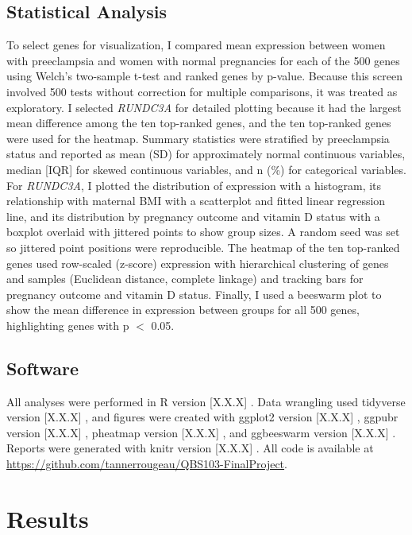 \documentclass[11pt]{article}
\begin{document}
\subsection{Statistical Analysis}
To select genes for visualization, I compared mean expression between women with preeclampsia and women with normal pregnancies for each of the 500 genes using Welch's two-sample t-test and ranked genes by p-value. Because this screen involved 500 tests without correction for multiple comparisons, it was treated as exploratory. I selected \textit{RUNDC3A} for detailed plotting because it had the largest mean difference among the ten top-ranked genes, and the ten top-ranked genes were used for the heatmap. Summary statistics were stratified by preeclampsia status and reported as mean (SD) for approximately normal continuous variables, median [IQR] for skewed continuous variables, and n (\%) for categorical variables. For \textit{RUNDC3A}, I plotted the distribution of expression with a histogram, its relationship with maternal BMI with a scatterplot and fitted linear regression line, and its distribution by pregnancy outcome and vitamin D status with a boxplot overlaid with jittered points to show group sizes. A random seed was set so jittered point positions were reproducible. The heatmap of the ten top-ranked genes used row-scaled (z-score) expression with hierarchical clustering of genes and samples (Euclidean distance, complete linkage) and tracking bars for pregnancy outcome and vitamin D status. Finally, I used a beeswarm plot to show the mean difference in expression between groups for all 500 genes, highlighting genes with p $<$ 0.05.

\subsection{Software}
All analyses were performed in R version [X.X.X] \citep{R-base}. Data wrangling used tidyverse version [X.X.X] \citep{R-tidyverse}, and figures were created with ggplot2 version [X.X.X] \citep{R-ggplot2}, ggpubr version [X.X.X] \citep{R-ggpubr}, pheatmap version [X.X.X] \citep{R-pheatmap}, and ggbeeswarm version [X.X.X] \citep{R-ggbeeswarm}. Reports were generated with knitr version [X.X.X] \citep{R-knitr}. All code is available at \url{https://github.com/tannerrougeau/QBS103-FinalProject}.
\section{Results}
\end{document}
